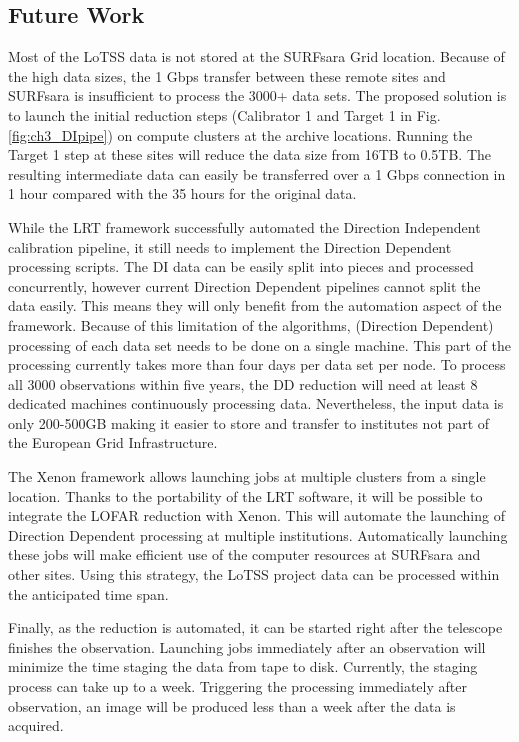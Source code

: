 \subsection{Future Work}\label{sec:ch3_future}


Most of the LoTSS data is not stored at the SURFsara Grid location. Because of the high data sizes, the 1 Gbps transfer between these remote sites and SURFsara is insufficient to process the 3000+ data sets. The proposed solution is to launch the initial reduction steps (Calibrator 1 and Target 1 in Fig.\ref{fig:ch3_DIpipe}) on compute clusters at the archive locations. Running the Target 1 step at these sites will reduce the data size from 16TB to 0.5TB. The resulting intermediate data can easily be transferred over a 1 Gbps connection in 1 hour compared with the 35 hours for the original data. 

While the LRT framework successfully automated the Direction Independent calibration pipeline, it still needs to  implement the Direction Dependent processing scripts. The DI data can be easily split into pieces and processed concurrently, however current Direction Dependent pipelines cannot split the data easily. This means they will only benefit from the automation aspect of the framework. Because of this limitation of the algorithms, (Direction Dependent) processing of each data set needs to be done on a single machine.  This part of the processing currently takes more than four days per data set per node. To process all 3000 observations within five years, the DD reduction will need at least 8 dedicated machines continuously processing data. Nevertheless, the input data is only 200-500GB making it easier to store and transfer to institutes not part of the European Grid Infrastructure. 

The Xenon framework\cite{maasen_xenon} allows launching jobs at multiple clusters from a single location. Thanks to the portability of the LRT software, it will be possible to integrate the LOFAR reduction with Xenon. This will automate the launching of Direction Dependent processing at multiple institutions. Automatically launching these jobs will make efficient use of the computer resources at SURFsara and other sites. Using this strategy, the LoTSS project data can be processed within the anticipated time span. 

Finally, as the reduction is automated, it can be started right after the telescope finishes the observation. Launching jobs immediately after  an observation will minimize the time staging the data from tape to disk. Currently, the staging process can take up to a week. Triggering the processing immediately after observation, an image will be produced less than a week after the data is acquired. 

